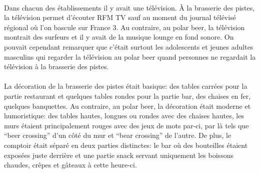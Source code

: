 \paragraph{} Dans chacun des établissements il y avait une télévision. À la
brasserie des pistes, la télévision permet d'écouter RFM TV sauf au moment du
journal télévisé régional où l'on bascule sur France 3. Au contraire, au polar
beer, la télévision montrait des surfeurs et il y avait de la musique lounge en
fond sonore. On pouvait cependant remarquer que c'était surtout les adolescents
et jeunes adultes masculins qui regarder la télévision au polar beer quand
personnes ne regardait la télévision à la brasserie des pistes.

\paragraph{} La décoration de la brasserie des pistes était basique: des tables
carrées pour la partie restaurant et quelques tables rondes pour la partie bar,
des chaises en fer, quelques banquettes. Au contraire, au polar beer, la
décoration était moderne et humoristique: des tables hautes, longues ou rondes
avec des chaises hautes, les murs étaient principalement rouges avec des jeux
de mots par-ci, par là tels que ``beer crossing'' d'un côté du mur et ``bear
crossing'' de l'autre. De plus, le comptoir était séparé en deux parties
distinctes: le bar où des bouteilles étaient exposées juste derrière et une
partie snack servant uniquement les boissons chaudes, crêpes et gâteaux à cette
heure-ci.

